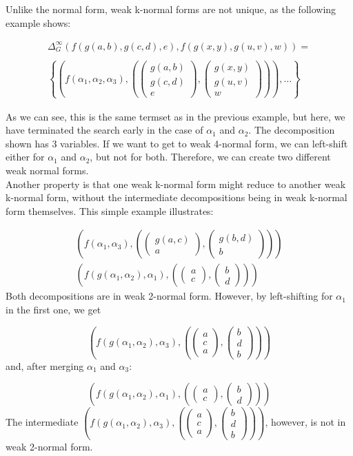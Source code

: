 \documentclass[a4paper, 11pt]{report}
\newcommand{\colvec}[1]{\left(\begin{array}{c}#1\end{array}\right)}
\begin{document}
\medskip

Unlike the normal form, weak k-normal forms are not unique, as the following example shows:

$$
  \begin{array}{l}
    \Delta_G^\infty(f(g(a,b),g(c,d),e), f(g(x,y),g(u,v),w)) =\\
    \\
    \left\{\left(f(\alpha_1,\alpha_2,\alpha_3), \left(\colvec{g(a,b)\\g(c,d)\\e}, \colvec{g(x,y)\\g(u,v)\\w}\right)\right), \dots\right\}
  \end{array}
$$

As we can see, this is the same termset as in the previous example, but here, we have terminated the search early in the case of $\alpha_1$ and $\alpha_2$. The decomposition shown has 3 variables. If we want to get to weak 4-normal form, we can left-shift either for $\alpha_1$ and $\alpha_2$, but not for both. Therefore, we can create two different weak normal forms.\\

Another property is that one weak k-normal form might reduce to another weak k-normal form, without the intermediate decompositions being in weak k-normal form themselves. This simple example illustrates:

$$
  \begin{array}{l}
    \left(f(\alpha_1,\alpha_3), \left(\colvec{g(a,c)\\a}, \colvec{g(b,d)\\b}\right)\right)\\
    \left(f(g(\alpha_1,\alpha_2),\alpha_1), \left(\colvec{a\\c}, \colvec{b\\d}\right)\right)
  \end{array}
$$
\noindent
Both decompositions are in weak 2-normal form. However, by left-shifting for $\alpha_1$ in the first one, we get

$$
  \left(f(g(\alpha_1,\alpha_2),\alpha_3), \left(\colvec{a\\c\\a}, \colvec{b\\d\\b}\right)\right)
$$
\noindent
and, after merging $\alpha_1$ and $\alpha_3$:

$$
 \left(f(g(\alpha_1,\alpha_2),\alpha_1), \left(\colvec{a\\c}, \colvec{b\\d}\right)\right)
$$
\noindent
The intermediate $\left(f(g(\alpha_1,\alpha_2),\alpha_3), \left(\colvec{a\\c\\a}, \colvec{b\\d\\b}\right)\right)$, however, is not in weak 2-normal form.\\
\end{document}
